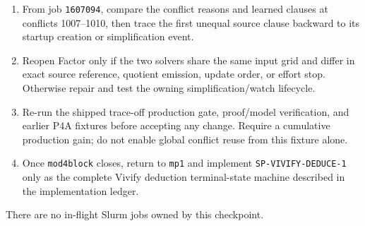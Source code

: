 \documentclass[11pt]{article}
\newcommand{\code}[1]{\nolinkurl{#1}}
\begin{document}
\begin{enumerate}[leftmargin=*,itemsep=3pt]
  \item From job \code{1607094}, compare the conflict reasons and learned
  clauses at conflicts 1007--1010, then trace the first unequal source clause
  backward to its startup creation or simplification event.
  \item Reopen Factor only if the two solvers share the same input grid and
  differ in exact source reference, quotient emission, update order, or effort
  stop.  Otherwise repair and test the owning simplification/watch lifecycle.
  \item Re-run the shipped trace-off production gate, proof/model verification,
  and earlier P4A fixtures before accepting any change.  Require a cumulative
  production gain; do not enable global conflict reuse from this fixture alone.
  \item Once \code{mod4block} closes, return to \code{mp1} and implement
  \code{SP-VIVIFY-DEDUCE-1} only as the complete Vivify deduction terminal-state
  machine described in the implementation ledger.
\end{enumerate}

There are no in-flight Slurm jobs owned by this checkpoint.
\end{document}
